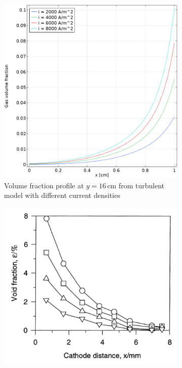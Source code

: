 \begin{figure}[H]
\centering
\begin{subfigure}{.5\textwidth}
  \centering
  \includegraphics[width=1\linewidth]{volumefractionturbulentcurrentdensitycomparisonnosaff.png}
  \caption{Volume fraction profile at $y = 16 \, \mathrm{cm}$ from turbulent model with different current densities}
\end{subfigure}%
\begin{subfigure}{.5\textwidth}
  \centering
  \includegraphics[width=1\linewidth]{profile.png}

\end{subfigure}
\end{figure}
